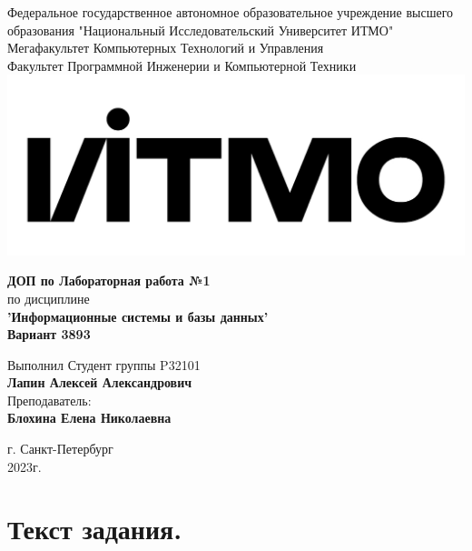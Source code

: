 \documentclass[12pt,onecolumn]{article}
\begin{document}
\setcounter{tocdepth}{4}
\begin{center}
    Федеральное государственное автономное образовательное учреждение высшего образования "Национальный Исследовательский Университет ИТМО"\\ 
    Мегафакультет Компьютерных Технологий и Управления\\
    Факультет Программной Инженерии и Компьютерной Техники \\
    \includegraphics[scale=0.3]{image/itmo.jpg} %
\end{center}
\vspace{1cm}


\begin{center}
    \textbf{ДОП по Лабораторная работа №1}\\
    по дисциплине\\
    \textbf{'Информационные системы и базы данных'}\\
    \textbf{Вариант 3893}
\end{center}

\vspace{2cm}

\begin{flushright}
  Выполнил Студент  группы P32101\\
  \textbf{Лапин Алексей Александрович}\\
  Преподаватель: \\
  \textbf{Блохина Елена Николаевна}\\
\end{flushright}

\vspace{6cm}
\begin{center}
    г. Санкт-Петербург\\
    2023г.
\end{center}

\newpage
\tableofcontents
\newpage

\section{Текст задания.}
\end{document}
